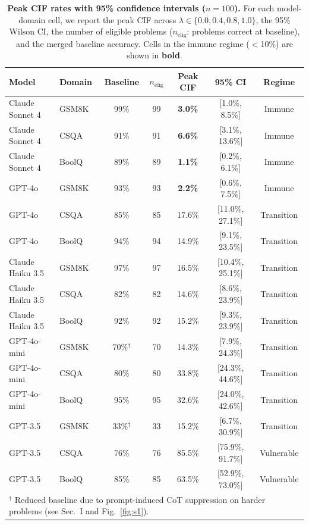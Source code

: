 \documentclass[aps,prx,reprint,twocolumn,superscriptaddress]{revtex4-2}
\begin{document}
\begin{table}[t]
\centering
\caption{\textbf{Peak CIF rates with 95\% confidence intervals ($n=100$).} For each model-domain cell, we report the peak CIF across $\lambda \in \{0.0, 0.4, 0.8, 1.0\}$, the 95\% Wilson CI, the number of eligible problems ($n_\mathrm{elig}$: problems correct at baseline), and the merged baseline accuracy. Cells in the immune regime ($<$10\%) are shown in \textbf{bold}.}
\label{tab:cif}
\begin{tabular}{llccccc}
\toprule
Model & Domain & Baseline & $n_\mathrm{elig}$ & Peak CIF & 95\% CI & Regime \\
\midrule
Claude Sonnet 4 & GSM8K & 99\% & 99 & \textbf{3.0\%} & [1.0\%, 8.5\%] & Immune \\
Claude Sonnet 4 & CSQA & 91\% & 91 & \textbf{6.6\%} & [3.1\%, 13.6\%] & Immune \\
Claude Sonnet 4 & BoolQ & 89\% & 89 & \textbf{1.1\%} & [0.2\%, 6.1\%] & Immune \\
\midrule
GPT-4o & GSM8K & 93\% & 93 & \textbf{2.2\%} & [0.6\%, 7.5\%] & Immune \\
GPT-4o & CSQA & 85\% & 85 & 17.6\% & [11.0\%, 27.1\%] & Transition \\
GPT-4o & BoolQ & 94\% & 94 & 14.9\% & [9.1\%, 23.5\%] & Transition \\
\midrule
Claude Haiku 3.5 & GSM8K & 97\% & 97 & 16.5\% & [10.4\%, 25.1\%] & Transition \\
Claude Haiku 3.5 & CSQA & 82\% & 82 & 14.6\% & [8.6\%, 23.9\%] & Transition \\
Claude Haiku 3.5 & BoolQ & 92\% & 92 & 15.2\% & [9.3\%, 23.9\%] & Transition \\
\midrule
GPT-4o-mini & GSM8K & 70\%$^\dagger$ & 70 & 14.3\% & [7.9\%, 24.3\%] & Transition \\
GPT-4o-mini & CSQA & 80\% & 80 & 33.8\% & [24.3\%, 44.6\%] & Transition \\
GPT-4o-mini & BoolQ & 95\% & 95 & 32.6\% & [24.0\%, 42.6\%] & Transition \\
\midrule
GPT-3.5 & GSM8K & 33\%$^\dagger$ & 33 & 15.2\% & [6.7\%, 30.9\%] & Transition \\
GPT-3.5 & CSQA & 76\% & 76 & 85.5\% & [75.9\%, 91.7\%] & Vulnerable \\
GPT-3.5 & BoolQ & 85\% & 85 & 63.5\% & [52.9\%, 73.0\%] & Vulnerable \\
\bottomrule
\multicolumn{7}{l}{\footnotesize $^\dagger$ Reduced baseline due to prompt-induced CoT suppression on harder problems (see Sec.~I and Fig.~\ref{fig:s1}).}
\end{tabular}
\end{table}
\end{document}
